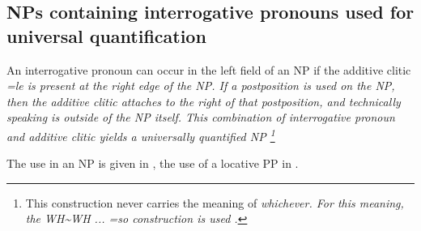 

%

\subsection{NPs containing interrogative pronouns used for universal quantification}\label{sec:nppp:NPscontaininginterrogativepronounsusedforuniversalquantification}
An interrogative pronoun can occur in the left field of an NP if the additive clitic \em =le \em is present at the right edge of the NP. If a postposition is used on the NP, then the additive clitic attaches to the right of that postposition, and technically speaking is outside of the NP itself. This combination of interrogative pronoun and additive clitic yields a universally quantified NP
\footnote{This construction never carries the meaning of \em whichever\em. For this meaning, the WH\~{}WH ... =\em so \em construction is used .}


The use in an NP is given in , the use of a locative PP in .


